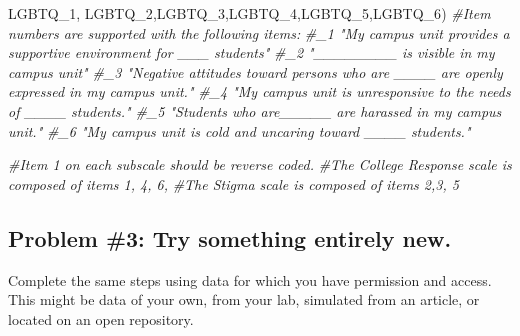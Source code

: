 \documentclass[
  english,
]{book}
\newenvironment{Shaded}{\begin{snugshade}}{\end{snugshade}}
\newcommand{\CommentTok}[1]{\textcolor[rgb]{0.56,0.35,0.01}{\textit{#1}}}
\newcommand{\NormalTok}[1]{#1}
\newcommand{\StringTok}[1]{\textcolor[rgb]{0.31,0.60,0.02}{#1}}
\begin{document}
\begin{Shaded}
\begin{Highlighting}[]
         \StringTok{\textquotesingle{}LGBTQ\_1\textquotesingle{}}\NormalTok{, }\StringTok{\textquotesingle{}LGBTQ\_2\textquotesingle{}}\NormalTok{,}\StringTok{\textquotesingle{}LGBTQ\_3\textquotesingle{}}\NormalTok{,}\StringTok{\textquotesingle{}LGBTQ\_4\textquotesingle{}}\NormalTok{,}\StringTok{\textquotesingle{}LGBTQ\_5\textquotesingle{}}\NormalTok{,}\StringTok{\textquotesingle{}LGBTQ\_6\textquotesingle{}}\NormalTok{)}
\CommentTok{\#Item numbers are supported with the following items:}
\CommentTok{\#\_1 "My campus unit provides a supportive environment for \_\_\_ students"}
\CommentTok{\#\_2 "\_\_\_\_\_\_\_\_ is visible in my campus unit"}
\CommentTok{\#\_3 "Negative attitudes toward persons who are \_\_\_\_ are openly expressed in my campus unit."}
\CommentTok{\#\_4 "My campus unit is unresponsive to the needs of \_\_\_\_ students."}
\CommentTok{\#\_5 "Students who are\_\_\_\_\_ are harassed in my campus unit."}
\CommentTok{\#\_6 "My campus unit is cold and uncaring toward \_\_\_\_ students."}

\CommentTok{\#Item 1 on each subscale should be reverse coded.}
\CommentTok{\#The College Response scale is composed of items 1, 4, 6, }
\CommentTok{\#The Stigma scale is composed of items 2,3, 5}
\end{Highlighting}
\end{Shaded}

\hypertarget{problem-3-try-something-entirely-new.}{%
\subsection{Problem \#3: Try something entirely new.}\label{problem-3-try-something-entirely-new.}}

Complete the same steps using data for which you have permission and access. This might be data of your own, from your lab, simulated from an article, or located on an open repository.
\end{document}
